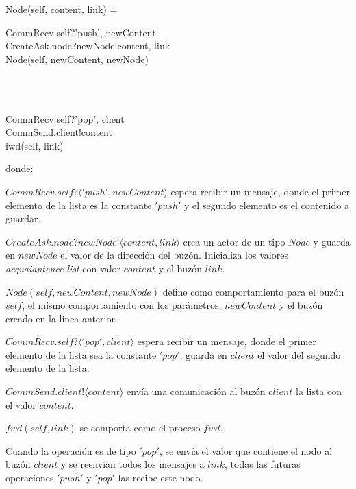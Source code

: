 \begin{process}
Node(self, content, link) = {} \\ \quad
\begin{block}
CommRecv.self?\langle 'push', newContent \rangle \then \\
CreateAsk.node?newNode!\langle content, link \rangle \then \\
Node(self, newContent, newNode)
\end{block} \\
\Extchoice \\ \quad
\begin{block}
CommRecv.self?\langle 'pop', client \rangle \then  \\
CommSend.client!\langle content \rangle \then  \\
fwd(self, link)
\end{block}

\end{process}
donde:
\begin{description}
 \item $CommRecv.self?\langle 'push', newContent \rangle$ espera recibir un mensaje, donde el primer elemento de la lista es la constante $'push'$ y el segundo elemento es el contenido a guardar.
 \item  \item $CreateAsk.node?newNode!\langle content, link \rangle$ crea un actor de un tipo $Node$ y guarda en $newNode$ el valor de la dirección del buzón. Inicializa los valores \textit{acquaiantence-list} con valor $content$ y el buzón $link$.
 \item $Node(self, newContent, newNode)$ define como comportamiento para el buzón $self$, el mismo comportamiento con los parámetros, $newContent$ y el buzón creado en la linea anterior.
 \item $CommRecv.self?\langle 'pop', client \rangle$ espera recibir un mensaje, donde el primer elemento de la lista sea la constante $'pop'$, guarda en $client$ el valor del segundo elemento de la lista.
 \item $CommSend.client!\langle content \rangle$ envía una comunicación al buzón $client$ la lista con el valor $content$.
 \item $fwd(self, link)$ se comporta como el proceso $fwd$.
\end{description}

Cuando la operación es de tipo $'pop'$, se envía el valor que contiene el nodo al buzón $client$ y se reenvían todos los mensajes a $link$, todas las futuras operaciones $'push'$ y $'pop'$ las recibe este nodo.

